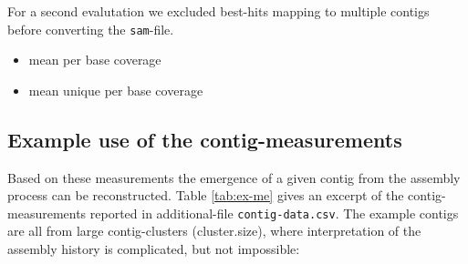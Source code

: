\documentclass[12pt,a4paper]{article}
\begin{document}
For a second evalutation we excluded best-hits mapping to multiple
contigs before converting the \texttt{sam}-file. 
\begin{itemize}
\item mean per base coverage
\item mean unique per base coverage

\end{itemize}

\subsection{Example use of the contig-measurements}

Based on these measurements the emergence of a given contig from the
assembly process can be reconstructed. Table \ref{tab:ex-me} gives an
excerpt of the contig-measurements reported in additional-file
\texttt{contig-data.csv}. The example contigs are all from large
contig-clusters (cluster.size), where interpretation of the assembly
history is complicated, but not impossible:
\end{document}
